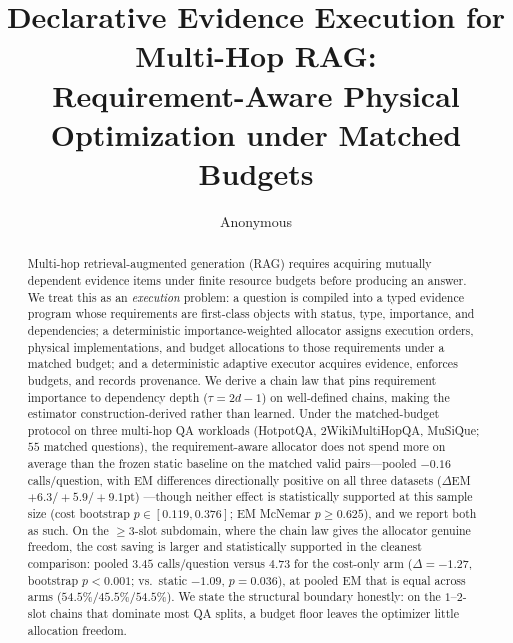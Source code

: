 \documentclass[sigconf]{acmart}
\title{Declarative Evidence Execution for Multi-Hop RAG:\\ Requirement-Aware
Physical Optimization under Matched Budgets}
\author{Anonymous}
\affiliation{%
  \institution{Anonymous Institution}
  \country{}
}
\begin{document}
\begin{abstract}
Multi-hop retrieval-augmented generation (RAG) requires acquiring mutually
dependent evidence items under finite resource budgets before producing an
answer. We treat this as an \emph{execution} problem: a question is compiled
into a typed evidence program whose requirements are first-class objects with
status, type, importance, and dependencies; a deterministic importance-weighted
allocator assigns execution orders, physical implementations, and budget
allocations to those requirements under a matched budget; and a
deterministic adaptive executor acquires evidence, enforces budgets, and
records provenance. We derive a chain law that pins requirement importance to
dependency depth ($\tau = 2d-1$) on well-defined chains, making the estimator
construction-derived rather than learned. Under the matched-budget protocol on
three multi-hop QA workloads (HotpotQA, 2WikiMultiHopQA, MuSiQue; $55$ matched
questions), the requirement-aware allocator does not spend more on average than
the frozen static baseline on the matched valid pairs---pooled $-0.16$ calls/question, with EM differences
directionally positive on all three datasets ($\Delta$EM $+6.3/+5.9/+9.1$pt)
---though neither effect is statistically supported at this sample size
(cost bootstrap $p\in[0.119,0.376]$; EM McNemar $p\geq0.625$), and we report
both as such. On the $\ge 3$-slot subdomain, where the chain law gives the
allocator genuine freedom, the cost saving is larger and statistically
supported in the cleanest comparison: pooled $3.45$ calls/question versus
$4.73$ for the cost-only arm ($\Delta=-1.27$, bootstrap $p<0.001$; vs.\
static $-1.09$, $p=0.036$), at pooled EM that is equal across arms
($54.5\%/45.5\%/54.5\%$). We state the structural boundary honestly: on the
$1$--$2$-slot chains that dominate most QA splits, a budget floor leaves the
optimizer little allocation freedom.
\end{abstract}

\maketitle















\end{document}
